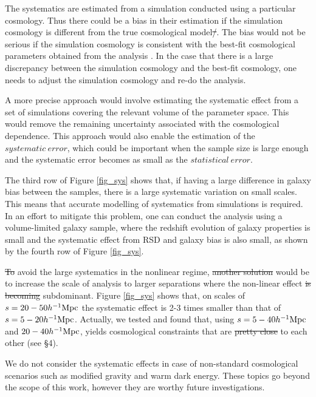 \documentclass[iop]{emulateapj}
\providecommand{\DIFadd}[1]{{\protect\color{blue}\uwave{#1}}} %
\providecommand{\DIFdel}[1]{{\protect\color{red}\sout{#1}}}                      %
\providecommand{\DIFaddbegin}{} %
\providecommand{\DIFaddend}{} %
\providecommand{\DIFdelbegin}{} %
\providecommand{\DIFdelend}{} %
\begin{document}
The systematics are estimated from a simulation conducted using a particular cosmology. 
Thus there could be a bias in their estimation if the simulation cosmology is different from the true cosmological model\DIFdelbegin \DIFdel{/}\DIFdelend . 
The bias would not be serious if the simulation cosmology is consistent with the best-fit cosmological parameters obtained from the analysis \cite{Li2016}. 
In the case that there is a large discrepancy between the simulation cosmology and the best-fit cosmology, one needs to adjust the simulation cosmology and re-do the analysis.

A more precise approach would involve estimating the systematic effect from a set of simulations covering the relevant volume of the parameter space. 
This would remove the remaining uncertainty associated with the cosmological dependence. 
This approach would also enable the estimation of the $systematic\ error$, 
which could be important when the sample size is large enough and the systematic error becomes as small as the $statistical\ error$.

The third row of Figure \ref{fig_sys} shows that, 
if having a large difference in galaxy bias between the samples,
there is a large systematic variation on small scales. 
This means that accurate modelling of systematics from simulations is required. 
In an effort to mitigate this problem, one can conduct the analysis using a volume-limited galaxy sample, 
where the redshift evolution of galaxy properties is small and the systematic effect from RSD and galaxy bias is also small,
as shown by the fourth row of Figure \ref{fig_sys}.

\DIFdelbegin \DIFdel{To }\DIFdelend \DIFaddbegin \DIFadd{Another solution, to }\DIFaddend avoid the large systematics in the nonlinear regime, 
\DIFdelbegin \DIFdel{another solution }\DIFdelend would be to increase the scale of analysis to larger separations where the non-linear effect \DIFdelbegin \DIFdel{is becoming }\DIFdelend \DIFaddbegin \DIFadd{becomes }\DIFaddend subdominant. 
Figure \ref{fig_sys} shows that, 
on scales of $s=20-50 h^{-1} {\rm Mpc}$ the systematic effect is 2-3 times smaller than that of $s=5-20 h^{-1} {\rm Mpc}$. 
Actually, we tested and found that, using $s = 5-40 h^{-1} {\rm Mpc}$ and $20-40 h^{-1} {\rm Mpc}$, 
yields cosmological constraints that are \DIFdelbegin \DIFdel{pretty close }\DIFdelend \DIFaddbegin \DIFadd{similar }\DIFaddend to each other (see \S 4). 

We do not consider the systematic effects in case of non-standard cosmological scenarios such as modified gravity and warm dark energy. These topics go beyond the scope of this \DIFaddbegin \DIFadd{preliminary }\DIFaddend work, however they are worthy future investigations.
\end{document}
